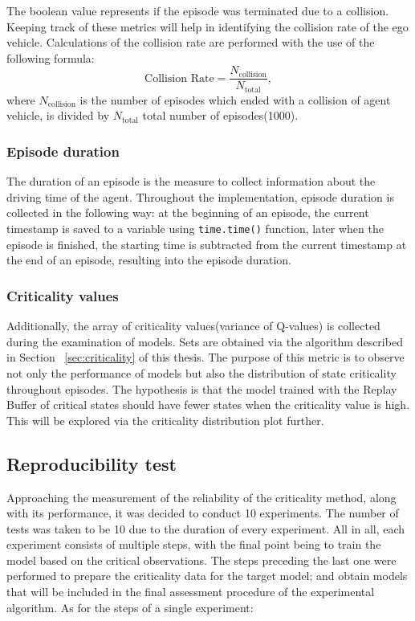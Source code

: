 The boolean value represents if the episode was terminated due to a collision. Keeping track of these metrics will help in identifying the collision rate of the ego vehicle. Calculations of the collision rate are performed with the use of the following formula:
\begin{equation}
 \text{Collision Rate} = \frac{N_{\text{collision}}}{N_{\text{total}}},
    \label{eq:collision_rate}
\end{equation}
where \(N_{\text{collision}}\) is the number of episodes which ended with a collision of agent vehicle, is divided by \(N_{\text{total}}\) total number of episodes(1000).

\subsubsection{Episode duration}\label{sec:duration}

The duration of an episode is the measure to collect information about the driving time of the agent. Throughout the implementation, episode duration is collected in the following way: at the beginning of an episode, the current timestamp is saved to a variable using \texttt{time.time()} function, later when the episode is finished, the starting time is subtracted from the current timestamp at the end of an episode, resulting into the episode duration.

\subsubsection{Criticality values}\label{sec:criticality_values}

Additionally, the array of criticality values(variance of Q-values) is collected during the examination of models. Sets are obtained via the algorithm described in Section ~\ref{sec:criticality} of this thesis. The purpose of this metric is to observe not only the performance of models but also the distribution of state criticality throughout episodes. The hypothesis is that the model trained with the Replay Buffer of critical states should have fewer states when the criticality value is high. This will be explored via the criticality distribution plot further.

\subsection{Reproducibility test}\label{sec:reproducibility_test}

Approaching the measurement of the reliability of the criticality method, along with its performance, it was decided to conduct 10 experiments. The number of tests was taken to be 10 due to the duration of every experiment. All in all, each experiment consists of multiple steps, with the final point being to train the model based on the critical observations. The steps preceding the last one were performed to prepare the criticality data for the target model; and obtain models that will be included in the final assessment procedure of the experimental algorithm. As for the steps of a single experiment:

